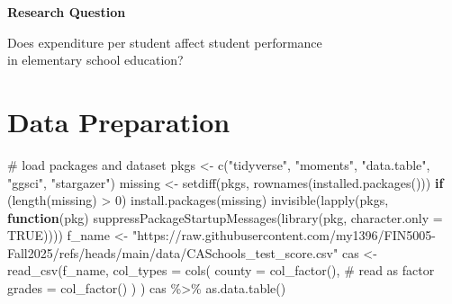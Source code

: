 \documentclass[
  12pt,
  letterpaper,
]{scrbook}
\newenvironment{Shaded}{\begin{snugshade}}{\end{snugshade}}
\newcommand{\AttributeTok}[1]{\textcolor[rgb]{0.40,0.45,0.13}{#1}}
\newcommand{\CommentTok}[1]{\textcolor[rgb]{0.37,0.37,0.37}{#1}}
\newcommand{\ConstantTok}[1]{\textcolor[rgb]{0.56,0.35,0.01}{#1}}
\newcommand{\ControlFlowTok}[1]{\textcolor[rgb]{0.00,0.23,0.31}{\textbf{#1}}}
\newcommand{\DecValTok}[1]{\textcolor[rgb]{0.68,0.00,0.00}{#1}}
\newcommand{\FunctionTok}[1]{\textcolor[rgb]{0.28,0.35,0.67}{#1}}
\newcommand{\NormalTok}[1]{\textcolor[rgb]{0.00,0.23,0.31}{#1}}
\newcommand{\OtherTok}[1]{\textcolor[rgb]{0.00,0.23,0.31}{#1}}
\newcommand{\SpecialCharTok}[1]{\textcolor[rgb]{0.37,0.37,0.37}{#1}}
\newcommand{\StringTok}[1]{\textcolor[rgb]{0.13,0.47,0.30}{#1}}
\theoremstyle{plain}
\theoremstyle{definition}
\theoremstyle{remark}
\begin{document}
\begin{tcolorbox}[enhanced jigsaw, bottomrule=.15mm, colframe=quarto-callout-important-color-frame, arc=.35mm, leftrule=.75mm, toprule=.15mm, breakable, rightrule=.15mm, opacityback=0, colback=white, left=2mm]

\vspace{-3mm}\textbf{Research Question}\vspace{3mm}

Does expenditure per student affect student performance\\
in elementary school education?

\end{tcolorbox}

\section{Data Preparation}\label{data-preparation}

\begin{Shaded}
\begin{Highlighting}[]
\CommentTok{\# load packages and dataset}
\NormalTok{pkgs }\OtherTok{\textless{}{-}} \FunctionTok{c}\NormalTok{(}\StringTok{"tidyverse"}\NormalTok{, }\StringTok{"moments"}\NormalTok{, }\StringTok{"data.table"}\NormalTok{, }\StringTok{"ggsci"}\NormalTok{, }\StringTok{"stargazer"}\NormalTok{)}
\NormalTok{missing }\OtherTok{\textless{}{-}} \FunctionTok{setdiff}\NormalTok{(pkgs, }\FunctionTok{rownames}\NormalTok{(}\FunctionTok{installed.packages}\NormalTok{()))}
\ControlFlowTok{if}\NormalTok{ (}\FunctionTok{length}\NormalTok{(missing) }\SpecialCharTok{\textgreater{}} \DecValTok{0}\NormalTok{) }\FunctionTok{install.packages}\NormalTok{(missing)}
\FunctionTok{invisible}\NormalTok{(}\FunctionTok{lapply}\NormalTok{(pkgs, }\ControlFlowTok{function}\NormalTok{(pkg) }\FunctionTok{suppressPackageStartupMessages}\NormalTok{(}\FunctionTok{library}\NormalTok{(pkg, }\AttributeTok{character.only =} \ConstantTok{TRUE}\NormalTok{))))}
\NormalTok{f\_name }\OtherTok{\textless{}{-}} \StringTok{"https://raw.githubusercontent.com/my1396/FIN5005{-}Fall2025/refs/heads/main/data/CASchools\_test\_score.csv"}
\NormalTok{cas }\OtherTok{\textless{}{-}} \FunctionTok{read\_csv}\NormalTok{(f\_name,}
    \AttributeTok{col\_types =} \FunctionTok{cols}\NormalTok{(}
        \AttributeTok{county =} \FunctionTok{col\_factor}\NormalTok{(), }\CommentTok{\# read as factor}
        \AttributeTok{grades =} \FunctionTok{col\_factor}\NormalTok{()}
\NormalTok{    )}
\NormalTok{)}
\NormalTok{cas }\SpecialCharTok{\%\textgreater{}\%} \FunctionTok{as.data.table}\NormalTok{()}
\end{Highlighting}
\end{Shaded}
\end{document}
